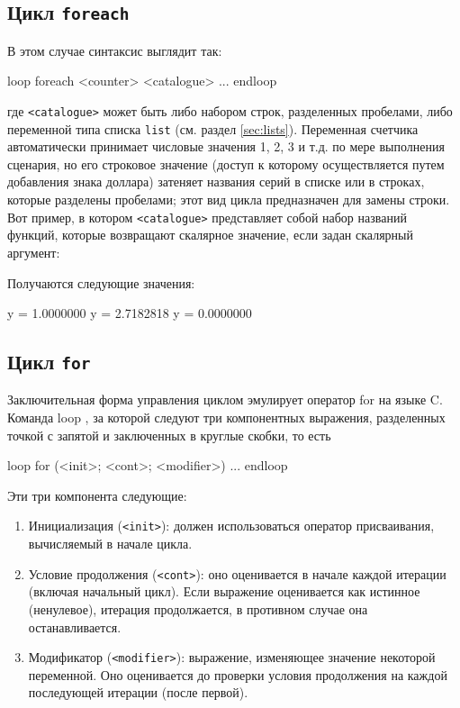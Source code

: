 \subsection{Цикл \texttt{foreach}}
\label{sec:loop-foreach}
В этом случае синтаксис выглядит так:
\begin{code}
loop foreach <counter> <catalogue>
   ...
endloop
\end{code}
где \texttt{<catalogue>} может быть либо набором строк, разделенных
пробелами, либо переменной типа списка \texttt{list} (см. раздел
\ref{sec:lists}). Переменная счетчика автоматически принимает числовые
значения 1, 2, 3 и т.д. по мере выполнения сценария, но его строковое
значение (доступ к которому осуществляется путем добавления знака
доллара) затеняет названия серий в списке или в строках, которые
разделены пробелами; этот вид цикла предназначен для замены строки.
Вот пример, в котором \texttt{<catalogue>} представляет собой набор
названий функций, которые возвращают скалярное значение, если задан
скалярный аргумент:


Получаются следующие значения:
\begin{code}
              y =  1.0000000
              y =  2.7182818
              y =  0.0000000
\end{code}

\subsection{Цикл \texttt{for}}

Заключительная форма управления циклом эмулирует оператор for на языке
C. Команда loop , за которой следуют три компонентных
выражения, разделенных точкой с запятой и заключенных в круглые
скобки, то есть
\begin{code}
loop for (<init>; <cont>; <modifier>)
   ...
endloop
\end{code}
Эти три компонента следующие:
\begin{enumerate}
\item Инициализация (\texttt{<init>}): должен использоваться оператор
  присваивания, вычисляемый в начале цикла.
\item Условие продолжения (\texttt{<cont>}): оно оценивается в начале
  каждой итерации (включая начальный цикл). Если выражение оценивается
  как истинное (ненулевое), итерация продолжается, в противном случае
  она останавливается.
\item Модификатор (\texttt{<modifier>}): выражение, изменяющее
  значение некоторой переменной. Оно оценивается до проверки условия
  продолжения на каждой последующей итерации (после первой).
\end{enumerate}

